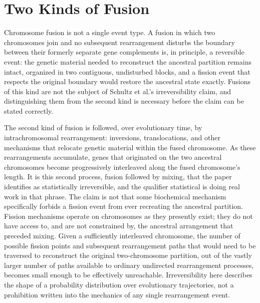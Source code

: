 \documentclass[11pt]{book}
\begin{document}
\section{Two Kinds of Fusion}

Chromosome fusion is not a single event type. A fusion in which two chromosomes join and no subsequent rearrangement disturbs the boundary between their formerly separate gene complements is, in principle, a reversible event: the genetic material needed to reconstruct the ancestral partition remains intact, organized in two contiguous, undisturbed blocks, and a fission event that respects the original boundary would restore the ancestral state exactly. Fusions of this kind are not the subject of Schultz et al.'s irreversibility claim, and distinguishing them from the second kind is necessary before the claim can be stated correctly.

The second kind of fusion is followed, over evolutionary time, by intrachromosomal rearrangement: inversions, translocations, and other mechanisms that relocate genetic material within the fused chromosome. As these rearrangements accumulate, genes that originated on the two ancestral chromosomes become progressively interleaved along the fused chromosome's length. It is this second process, fusion followed by mixing, that the paper identifies as statistically irreversible, and the qualifier statistical is doing real work in that phrase. The claim is not that some biochemical mechanism specifically forbids a fission event from ever recreating the ancestral partition. Fission mechanisms operate on chromosomes as they presently exist; they do not have access to, and are not constrained by, the ancestral arrangement that preceded mixing. Given a sufficiently interleaved chromosome, the number of possible fission points and subsequent rearrangement paths that would need to be traversed to reconstruct the original two-chromosome partition, out of the vastly larger number of paths available to ordinary undirected rearrangement processes, becomes small enough to be effectively unreachable. Irreversibility here describes the shape of a probability distribution over evolutionary trajectories, not a prohibition written into the mechanics of any single rearrangement event.
\end{document}

